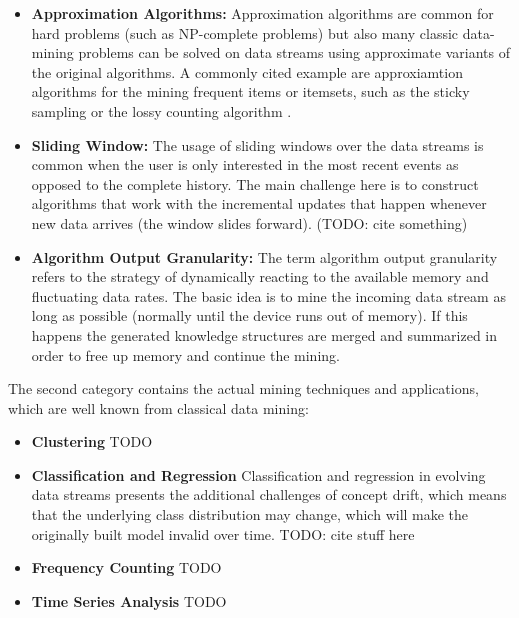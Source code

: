 \begin{itemize}
	\item \textbf{Approximation Algorithms:} Approximation algorithms are common for hard problems (such as NP-complete problems) but also many classic data-mining problems can be solved on data streams using approximate variants of the original algorithms. A commonly cited example are approxiamtion algorithms for the mining frequent items or itemsets, such as the sticky sampling or the lossy counting algorithm \cite{manku2002approximate}.
	\item \textbf{Sliding Window:} The usage of sliding windows over the data streams is common when the user is only interested in the most recent events as opposed to the complete history. The main challenge here is to construct algorithms that work with the incremental updates that happen whenever new data arrives (the window slides forward). (TODO: cite something)
	\item \textbf{Algorithm Output Granularity:} The term algorithm output granularity refers to the strategy of dynamically reacting to the available memory and fluctuating data rates. The basic idea is to mine the incoming data stream as long as possible (normally until the device runs out of memory). If this happens the generated knowledge structures are merged and summarized in order to free up memory and continue the mining. 
\end{itemize}

The second category contains the actual mining techniques and applications, which are well known from classical data mining:

\begin{itemize}
	\item \textbf{Clustering} TODO
	\item \textbf{Classification and Regression} Classification and regression in evolving data streams presents the additional challenges of concept drift, which means that the underlying class distribution may change, which will make the originally built model invalid over time. TODO: cite stuff here
	\item \textbf{Frequency Counting} TODO
	\item \textbf{Time Series Analysis} TODO
\end{itemize}

